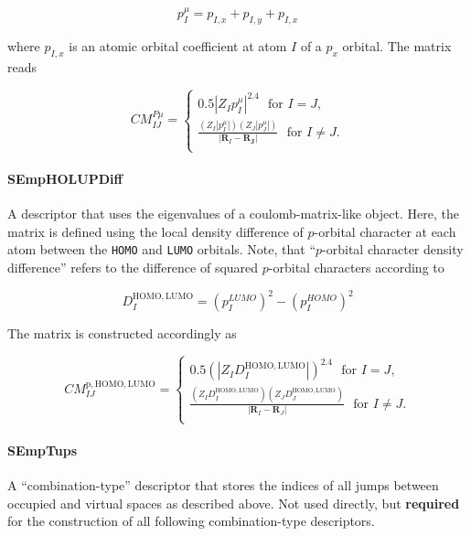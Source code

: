 \documentclass[12pt]{achemso}
\begin{document}
\begin{equation}
    p_I^\mu = p_{I, x} + p_{I, y} + p_{I, x}
\end{equation}

where $p_{I, x}$ is an atomic orbital coefficient at atom $I$ of a $p_x$ orbital. The matrix reads

\begin{equation}
    CM_{IJ}^{P\mu} =\begin{cases}
    0.5 |Z_I p_I^\mu|^{2.4} \,\,\,\, \mathrm{for}\,\, I = J,\\[0.5em]
    \frac{(Z_I |p_I^\mu|) (Z_J |p_J^\mu|)}{|\mathbf{R}_I - \mathbf{R_J}|} \,\,\,\, \mathrm{for}\,\, I \neq J.\\
    \end{cases}
\end{equation}

\paragraph{SEmpHOLUPDiff} 
A descriptor that uses the eigenvalues of a coulomb-matrix-like object. Here, the matrix is defined using the local density difference of $p$-orbital character at each atom between the \verb+HOMO+ and \verb+LUMO+ orbitals. Note, that ``$p$-orbital character density difference'' refers to the difference of squared $p$-orbital characters according to

\begin{equation}
    D_I^\mathrm{HOMO, LUMO} = (p_I^{LUMO})^2 - (p_I^{HOMO})^2
\end{equation}

The matrix is constructed accordingly as

\begin{equation}
    CM_{IJ}^\mathrm{p, HOMO, LUMO} =\begin{cases}
    0.5 (|Z_I D_I^\mathrm{HOMO, LUMO}|)^{2.4} \,\,\,\, \mathrm{for}\,\, I = J,\\[0.5em]
    \frac{(Z_I D_I^\mathrm{HOMO, LUMO}) (Z_J D_J^\mathrm{HOMO, LUMO})}{|\mathbf{R}_I - \mathbf{R}_J|} \,\,\,\, \mathrm{for}\,\, I \neq J.\\
    \end{cases}
\end{equation}

\paragraph{SEmpTups}
A ``combination-type'' descriptor that stores the indices of all jumps between occupied and virtual spaces as described above. Not used directly, but \textbf{required} for the construction of all following combination-type descriptors.
\end{document}
